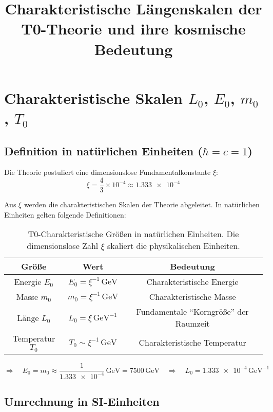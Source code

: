 \documentclass[12pt,a4paper]{article}
\title{Charakteristische Längenskalen der T0-Theorie und ihre kosmische Bedeutung}
\author{}
\date{}
\begin{document}
	
	\maketitle
	
	\section{Charakteristische Skalen $L_0$, $E_0$, $m_0$, $T_0$}
	
	\subsection{Definition in natürlichen Einheiten ($\hbar = c = 1$)}
	
	Die Theorie postuliert eine dimensionslose Fundamentalkonstante $\xi$:
	\[
	\xi = \frac{4}{3} \times 10^{-4} \approx \num{1,333e-4}
	\]
	
	Aus $\xi$ werden die charakteristischen Skalen der Theorie abgeleitet. In natürlichen Einheiten gelten folgende Definitionen:
	
	\begin{table}[h!]
		\centering
		\begin{tabular}{|c|c|c|}
			\hline
			\textbf{Größe} & \textbf{Wert} & \textbf{Bedeutung} \\
			\hline
			Energie $E_0$ & $E_0 = \xi^{-1} \, \text{GeV}$ & Charakteristische Energie \\
			Masse $m_0$ & $m_0 = \xi^{-1} \, \text{GeV}$ & Charakteristische Masse \\
			Länge $L_0$ & $L_0 = \xi \, \text{GeV}^{-1}$ & Fundamentale ``Korngröße'' der Raumzeit \\
			Temperatur $T_0$ & $T_0 \sim \xi^{-1} \, \text{GeV}$ & Charakteristische Temperatur \\
			\hline
		\end{tabular}
		\caption{T0-Charakteristische Größen in natürlichen Einheiten. Die dimensionslose Zahl $\xi$ skaliert die physikalischen Einheiten.}
	\end{table}
	
	\[
	\Rightarrow \quad E_0 = m_0 \approx \frac{1}{\num{1,333e-4}} \, \text{GeV} = 7500 \, \text{GeV} \quad \Rightarrow \quad L_0 = \num{1,333e-4} \, \text{GeV}^{-1}
	\]
	
	\subsection{Umrechnung in SI-Einheiten}
	
\end{document}
